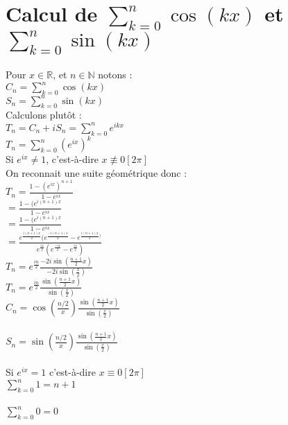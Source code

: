 \documentclass{article}
\begin{document}
\section{Calcul de $\sum_{k=0}^n \cos(kx)$ et $\sum_{k=0}^n\sin(kx)$}
Pour $x \in \mathbb{R}$, et $n \in \mathbb{N}$ notons : \\
\indent $C_n=\sum_{k=0}^n\cos(kx)$ \\
\indent $S_n=\sum_{k=0}^n\sin(kx)$ \\
Calculons plutôt : \\
\indent $T_n=C_n+iS_n=\sum_{k=0}^ne^{ikx}$ \\
\indent $T_n=\sum_{k=0}^n(e^{ix})^k$ \\
Si $e^{ix} \neq 1$, c'est-à-dire $x \not\equiv 0 [2\pi]$ \\
On reconnait une suite géométrique donc : \\
\indent $T_n=\frac{1-(e^{ix})^{n+1}}{1-e^{ix}}$ \\
\indent $=\frac{1-(e^{i(n+1)x}}{1-e^{ix}}$ \\
\indent $=\frac{1-(e^{i(n+1)x}}{1-e^{ix}}$ \\
\indent $=\frac{e^{\frac{i(n+1)x}{2}}(e^{\frac{-i(n+1)x}{2}}-e^{\frac{i(n+1)x}{2})}}{e^{\frac{ix}{2}}(e^{\frac{-ix}{2}}-e^{\frac{ix}{2}})}$ \\
$T_n=e^{\frac{in}{2}}\frac{-2i\sin(\frac{n+1}{2}x)}{-2i\sin(\frac{x}{2})}$ \\
$T_n=e^{\frac{in}{2}}\frac{\sin(\frac{n+1}{2}x)}{\sin(\frac{x}{2})}$ \\
\indent $C_n=\cos(\frac{n/2}{x})\frac{\sin(\frac{n+1}{2}x)}{\sin(\frac{x}{2})}$ \\ \\
\indent $S_n=\sin(\frac{n/2}{x})\frac{\sin(\frac{n+1}{2}x)}{\sin(\frac{x}{2})}$ \\ \\
Si $e^{ix}=1$ c'est-à-dire $x\equiv 0[2 \pi]$ \\
$\sum_{k=0}^n1=n+1$ \\ \\
$\sum_{k=0}^n0=0$ 
\end{document}
